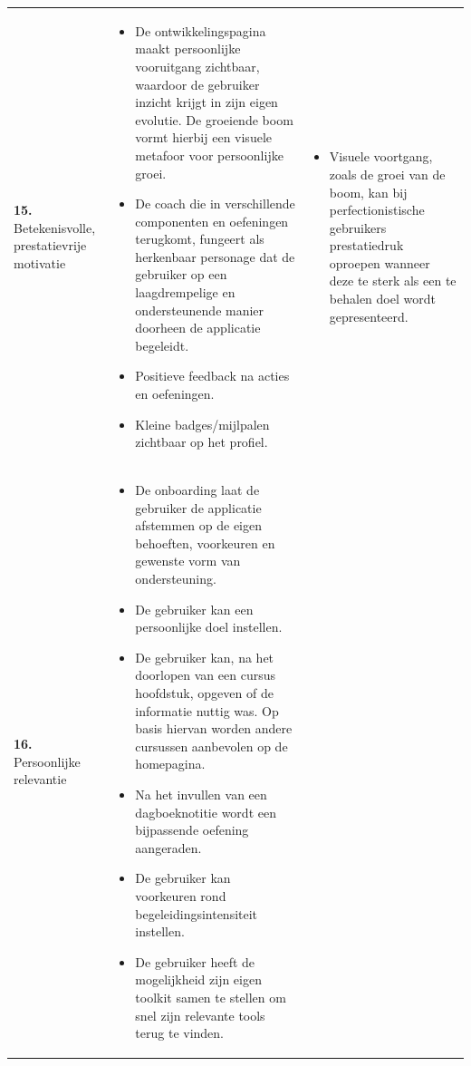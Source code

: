 {\begin{longtable}{
            >{\raggedright\arraybackslash}p{5.23cm}
            >{\raggedright\arraybackslash}p{4.93cm}
            >{\raggedright\arraybackslash}p{4.93cm}
        }
        \textbf{15.} Betekenisvolle, prestatievrije motivatie 
        &
        \begin{itemize}[nosep,leftmargin=*,itemsep=10pt]
            \renewcommand{\labelitemi}{+}
            \item De ontwikkelingspagina maakt persoonlijke vooruitgang zichtbaar, waardoor de gebruiker inzicht krijgt in zijn eigen evolutie. De groeiende boom vormt hierbij een visuele metafoor voor persoonlijke groei.
            \item De coach die in verschillende componenten en oefeningen terugkomt, fungeert als herkenbaar personage dat de gebruiker op een laagdrempelige en ondersteunende manier doorheen de applicatie begeleidt.
            \item Positieve feedback na acties en oefeningen.
            \item Kleine badges/mijlpalen zichtbaar op het profiel.
        \end{itemize}
        &
        \begin{itemize}[nosep,leftmargin=*,itemsep=10pt]
            \renewcommand{\labelitemi}{-}
            \item Visuele voortgang, zoals de groei van de boom, kan bij perfectionistische gebruikers prestatiedruk oproepen wanneer deze te sterk als een te behalen doel wordt gepresenteerd.
        \end{itemize}
        \\
        
        \addlinespace[5pt]
        
        \textbf{16.} Persoonlijke relevantie 
        &
        \begin{itemize}[nosep,leftmargin=*,itemsep=10pt]
            \renewcommand{\labelitemi}{+}
            \item De onboarding laat de gebruiker de applicatie afstemmen op de eigen behoeften, voorkeuren en gewenste vorm van ondersteuning.
            \item De gebruiker kan een persoonlijke doel instellen.
            \item De gebruiker kan, na het doorlopen van een cursus hoofdstuk, opgeven of de informatie nuttig was. Op basis hiervan worden andere cursussen aanbevolen op de homepagina.
            \item Na het invullen van een dagboeknotitie wordt een bijpassende oefening aangeraden.
            \item De gebruiker kan voorkeuren rond begeleidingsintensiteit instellen.
            \item De gebruiker heeft de mogelijkheid zijn eigen toolkit samen te stellen om snel zijn relevante tools terug te vinden.
        \end{itemize}
        &
        \\
        

\end{longtable}}

